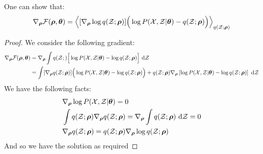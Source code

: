 \begin{proposition}
    One can show that:
    \begin{equation*}
        \nabla_{\boldsymbol \rho} \mathcal{F}(\boldsymbol \rho, \boldsymbol \theta) = \left\langle  [\nabla_{\boldsymbol \rho}\log q(\mathcal{Z};\boldsymbol \rho)] \Big( \log P(\mathcal{X}, \mathcal{Z} | \boldsymbol \theta) - q(\mathcal{Z};\boldsymbol \rho) \Big)  \right\rangle_{q(\mathcal{Z}; \boldsymbol \rho)}
    \end{equation*}
\end{proposition}
\begin{proof}
    We consider the following gradient:
    \begin{equation*}
    \begin{aligned}
        \nabla_{\boldsymbol \rho}\mathcal{F}(\boldsymbol \rho, \boldsymbol \theta) &= \nabla_{\boldsymbol \rho}\int q(\mathcal{Z};) \Big[ \log P(\mathcal{X}, \mathcal{Z} | \boldsymbol \theta) - \log q(\mathcal{Z};\boldsymbol \rho) \Big]\ \mathrm{d}\mathcal{Z} \\
        &= \int [\nabla_{\boldsymbol \rho} q(\mathcal{Z};\boldsymbol \rho) ] \Big( \log P(\mathcal{X}, \mathcal{Z} | \boldsymbol \theta) - \log q(\mathcal{Z}; \boldsymbol \rho) \Big) + q(\mathcal{Z};\boldsymbol \rho) \nabla_{\boldsymbol \rho}\left[  \log P(\mathcal{X}, \mathcal{Z} | \boldsymbol \theta) - \log q(\mathcal{Z} ; \boldsymbol \rho)  \right] \ \mathrm{d} \mathcal{Z}
    \end{aligned}
    \end{equation*}
    We have the following facts:
    \begin{equation*}
    \begin{aligned}
        &\nabla_{\boldsymbol \rho} \log P(\mathcal{X}, \mathcal{Z} | \boldsymbol \theta) = 0 \\
        &\int q(\mathcal{Z} ; \boldsymbol \rho)\nabla_{\boldsymbol \rho} q(\mathcal{Z}; \boldsymbol \rho) = \nabla_{\boldsymbol \rho}\int q(\mathcal{Z};\boldsymbol \rho)\ \mathrm{d}\mathcal{Z} = 0 \\
        &\nabla_{\boldsymbol \rho}q(\mathcal{Z};\boldsymbol \rho) = q(\mathcal{Z};\boldsymbol \rho) \nabla_{\boldsymbol \rho}\log q(\mathcal{Z};\boldsymbol \rho)
    \end{aligned}
    \end{equation*}
    And so we have the solution as required
\end{proof}

